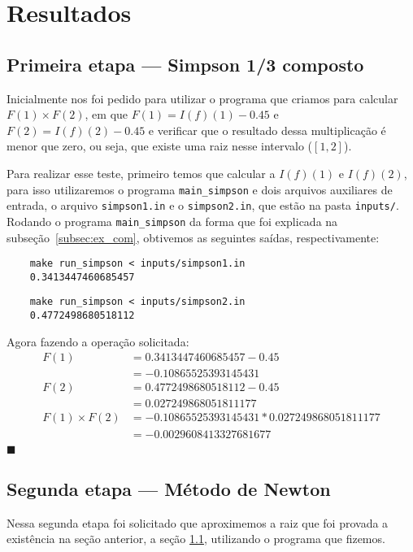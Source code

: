 \chapter{Resultados}
\section{Primeira etapa --- Simpson 1/3 composto}
\label{sec:resultadoSimpson}
Inicialmente nos foi pedido para utilizar o programa que criamos para calcular
\(F(1)\times F(2)\), em que \(F(1) = I(f)(1) - 0.45\) e  \(F(2) = I(f)(2) -
0.45\) e verificar que o resultado dessa multiplicação é menor que zero, ou
seja, que existe uma raiz nesse intervalo (\([1, 2]\)).

Para realizar esse teste, primeiro temos que calcular a \(I(f)(1)\) e
\(I(f)(2)\), para isso utilizaremos o programa \texttt{main\_simpson} e dois
arquivos auxiliares de entrada, o arquivo \texttt{simpson1.in} e o
\texttt{simpson2.in}, que estão na pasta \texttt{inputs/}. Rodando o programa
\texttt{main\_simpson} da forma que foi explicada na
subseção~\ref{subsec:ex_com}, obtivemos as seguintes saídas, respectivamente:

\begin{verbatim}
	make run_simpson < inputs/simpson1.in
	0.3413447460685457
\end{verbatim}

\begin{verbatim}
	make run_simpson < inputs/simpson2.in
	0.4772498680518112
\end{verbatim}

Agora fazendo a operação solicitada:
\begin{align*}
F(1) &=  0.3413447460685457- 0.45\\
     &= -0.10865525393145431\\
F(2) &=  0.4772498680518112 - 0.45\\
     &= 0.027249868051811177\\
F(1) \times F(2) &= -0.10865525393145431 * 0.027249868051811177\\
                 &= -0.0029608413327681677\\
\end{align*}
\hfill\(\blacksquare\)

\section{Segunda etapa --- Método de Newton}
Nessa segunda etapa foi solicitado que aproximemos a raiz que foi provada a
existência na seção anterior, a seção \ref{sec:resultadoSimpson}, utilizando o
programa que fizemos.

